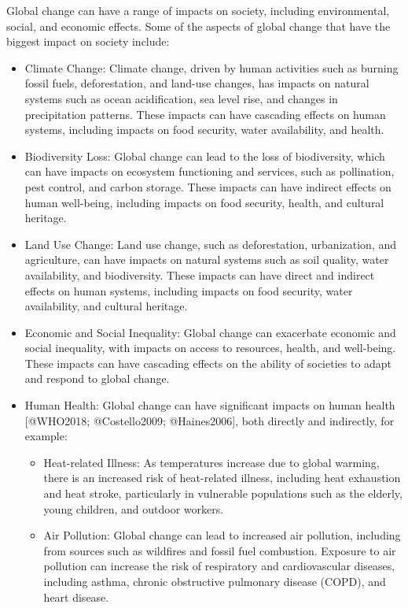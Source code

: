 Global change can have a range of impacts on society, including environmental, social, and economic effects. Some of the aspects of global change that have the biggest impact on society include:

\begin{itemize}
\item Climate Change: Climate change, driven by human activities such as burning fossil fuels, deforestation, and land-use changes, has impacts on natural systems such as ocean acidification, sea level rise, and changes in precipitation patterns. These impacts can have cascading effects on human systems, including impacts on food security, water availability, and health.
\item Biodiversity Loss: Global change can lead to the loss of biodiversity, which can have impacts on ecosystem functioning and services, such as pollination, pest control, and carbon storage. These impacts can have indirect effects on human well-being, including impacts on food security, health, and cultural heritage.
\item Land Use Change: Land use change, such as deforestation, urbanization, and agriculture, can have impacts on natural systems such as soil quality, water availability, and biodiversity. These impacts can have direct and indirect effects on human systems, including impacts on food security, water availability, and cultural heritage.
\item Economic and Social Inequality: Global change can exacerbate economic and social inequality, with impacts on access to resources, health, and well-being. These impacts can have cascading effects on the ability of societies to adapt and respond to global change.
\item Human Health: Global change can have significant impacts on human health [@WHO2018; @Costello2009; @Haines2006], both directly and indirectly, for example:
  \begin{itemize}
  \item Heat-related Illness: As temperatures increase due to global warming, there is an increased risk of heat-related illness, including heat exhaustion and heat stroke, particularly in vulnerable populations such as the elderly, young children, and outdoor workers.
  \item Air Pollution: Global change can lead to increased air pollution, including from sources such as wildfires and fossil fuel combustion. Exposure to air pollution can increase the risk of respiratory and cardiovascular diseases, including asthma, chronic obstructive pulmonary disease (COPD), and heart disease.

\end{itemize}
\end{itemize}
